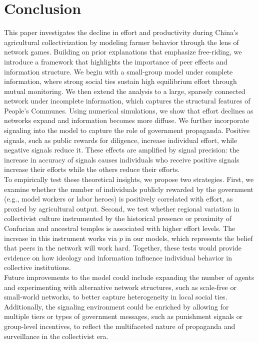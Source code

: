 \documentclass[12pt]{article}
\begin{document}
\section{Conclusion}
This paper investigates the decline in effort and productivity during China's agricultural collectivization by modeling farmer behavior through the lens of network games. Building on prior explanations that emphasize free-riding, we introduce a framework that highlights the importance of peer effects and information structure. We begin with a small-group model under complete information, where strong social ties sustain high equilibrium effort through mutual monitoring. We then extend the analysis to a large, sparsely connected network under incomplete information, which captures the structural features of People's Communes. Using numerical simulations, we show that effort declines as networks expand and information becomes more diffuse. We further incorporate signaling into the model to capture the role of government propaganda. Positive signals, such as public rewards for diligence, increase individual effort, while negative signals reduce it. These effects are amplified by signal precision: the increase in accuracy of signals causes individuals who receive positive signals increase their efforts while the others reduce their efforts.\\
To empirically test these theoretical insights, we propose two strategies. First, we examine whether the number of individuals publicly rewarded by the government (e.g., model workers or labor heroes) is positively correlated with effort, as proxied by agricultural output. Second, we test whether regional variation in collectivist culture instrumented by the historical presence or proximity of Confucian and ancestral temples is associated with higher effort levels. The increase in this instrument works via $p$ in our models, which represents the belief that peers in the network will work hard. Together, these tests would provide evidence on how ideology and information influence individual behavior in collective institutions.\\
Future improvements to the model could include expanding the number of agents and experimenting with alternative network structures, such as scale-free or small-world networks, to better capture heterogeneity in local social ties. Additionally, the signaling environment could be enriched by allowing for multiple tiers or types of government messages, such as punishment signals or group-level incentives, to reflect the multifaceted nature of propaganda and surveillance in the collectivist era.
  
\end{document}

